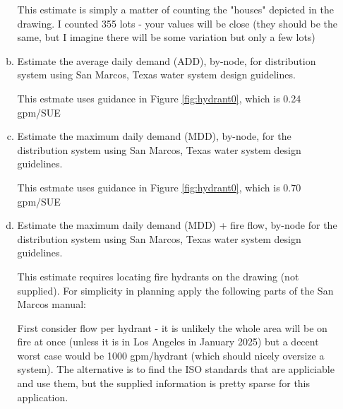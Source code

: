 \documentclass[12pt]{article}
\begin{document}
\begin{enumerate}
\begin{enumerate}[a)]
This estimate is simply a matter of counting the "houses" depicted in the drawing. I counted 355 lots - your values will be close (they should be the same, but I imagine there will be some variation but only a few lots)

\item Estimate the average daily demand (ADD), by-node, for distribution system using San Marcos, Texas water system design guidelines.

This estmate uses guidance in Figure \ref{fig:hydrant0}, which is 0.24 gpm/SUE

\item Estimate the maximum daily demand (MDD), by-node, for the distribution system using San Marcos, Texas water system design guidelines.

This estmate uses guidance in Figure \ref{fig:hydrant0}, which is 0.70 gpm/SUE

\item Estimate the maximum daily demand (MDD) + fire flow, by-node for the distribution system using San Marcos, Texas water system design guidelines.

This estimate requires locating fire hydrants on the drawing (not supplied).  For simplicity in planning apply the following parts of the San Marcos manual:

First consider flow per hydrant - it is unlikely the whole area will be on fire at once (unless it is in Los Angeles in January 2025) but a decent worst case would be 1000 gpm/hydrant (which should nicely oversize a system).  The alternative is to find the ISO standards that are appliciable and use them, but the supplied information is pretty sparse for this application.


\end{enumerate}
\end{enumerate}
\end{document}

